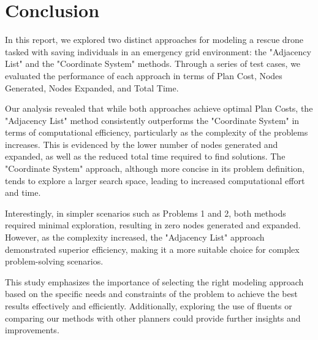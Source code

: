 \documentclass{article}
\begin{document}
\newpage
\section{Conclusion}

In this report, we explored two distinct approaches for modeling a rescue drone tasked with saving individuals in an emergency grid environment: the "Adjacency List" and the "Coordinate System" methods. Through a series of test cases, we evaluated the performance of each approach in terms of Plan Cost, Nodes Generated, Nodes Expanded, and Total Time.

\vspace{1em}

Our analysis revealed that while both approaches achieve optimal Plan Costs, the "Adjacency List" method consistently outperforms the "Coordinate System" in terms of computational efficiency, particularly as the complexity of the problems increases. This is evidenced by the lower number of nodes generated and expanded, as well as the reduced total time required to find solutions. The "Coordinate System" approach, although more concise in its problem definition, tends to explore a larger search space, leading to increased computational effort and time.

\vspace{1em}

Interestingly, in simpler scenarios such as Problems 1 and 2, both methods required minimal exploration, resulting in zero nodes generated and expanded. However, as the complexity increased, the "Adjacency List" approach demonstrated superior efficiency, making it a more suitable choice for complex problem-solving scenarios.

\vspace{1em}

This study emphasizes the importance of selecting the right modeling approach based on the specific needs and constraints of the problem to achieve the best results effectively and efficiently. Additionally, exploring the use of fluents or comparing our methods with other planners could provide further insights and improvements.
\end{document}
